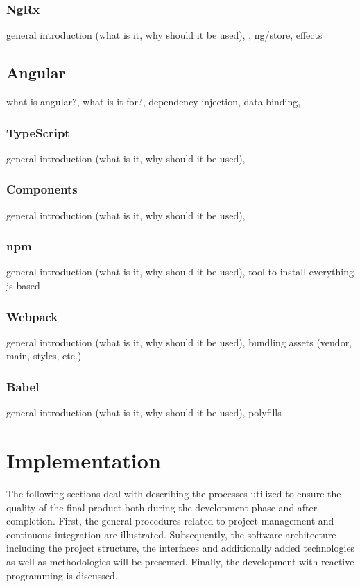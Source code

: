\documentclass[Bachelor,BIF,english]{twbook}
\begin{document}
\subsection{NgRx}
general introduction (what is it, why should it be used), \cite{Ngrx}, ng/store, effects

\section{Angular}
what is angular?, what is it for?, dependency injection, data binding, \cite[p.~]{YakovFainAngular}
\subsection{TypeScript}
general introduction (what is it, why should it be used), 
\subsection{Components}
general introduction (what is it, why should it be used), 
\subsection{npm}
general introduction (what is it, why should it be used), 
tool to install everything js based
\subsection{Webpack}
general introduction (what is it, why should it be used), 
bundling assets (vendor, main, styles, etc.)
\subsection{Babel}
general introduction (what is it, why should it be used), 
polyfills
\clearpage 

\chapter{Implementation}
The following sections deal with describing the processes utilized to ensure the quality of the final product both during the development phase and after completion. First, the general procedures related to project management and continuous integration are illustrated. Subsequently, the software architecture including the project structure, the interfaces and additionally added technologies as well as methodologies will be presented. Finally, the development with reactive programming is discussed.
\end{document}
